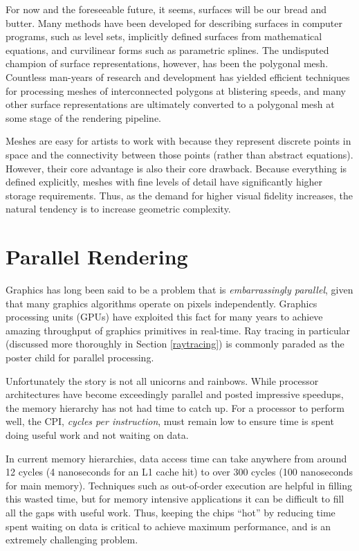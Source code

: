 \documentclass[12pt]{ucthesis}
\begin{document}
For now and the foreseeable future, it seems, surfaces will be our bread and
butter. Many methods have been developed for describing surfaces in computer
programs, such as level sets, implicitly defined surfaces from mathematical
equations, and curvilinear forms such as parametric splines. The undisputed
champion of surface representations, however, has been the polygonal mesh.
Countless man-years of research and development has yielded efficient
techniques for processing meshes of interconnected polygons at blistering
speeds, and many other surface representations are ultimately converted to a
polygonal mesh at some stage of the rendering pipeline.

Meshes are easy for artists to work with because they represent discrete
points in space and the connectivity between those points (rather than abstract
equations). However, their core advantage is also their core drawback. Because
everything is defined explicitly, meshes with fine levels of detail have
significantly higher storage requirements. Thus, as the demand for higher
visual fidelity increases, the natural tendency is to increase geometric
complexity.

\section{Parallel Rendering}
\label{parallel}

Graphics has long been said to be a problem that is \emph{embarrassingly parallel},
given that many graphics algorithms operate on pixels independently. Graphics
processing units (GPUs) have exploited this fact for many years to achieve
amazing throughput of graphics primitives in real-time. Ray tracing in
particular (discussed more thoroughly in Section \ref{raytracing}) is commonly
paraded as the poster child for parallel processing.

Unfortunately the story is not all unicorns and rainbows. While processor
architectures have become exceedingly parallel and posted impressive
speedups, the memory hierarchy has not had time to catch up. For a processor
to perform well, the CPI, \emph{cycles per instruction}, must remain low to
ensure time is spent doing useful work and not waiting on data.

In current memory hierarchies, data access time can take anywhere from around
12 cycles (4 nanoseconds for an L1 cache hit) to over 300 cycles (100
nanoseconds for main memory). Techniques such as out-of-order execution are
helpful in filling this wasted time, but for memory intensive applications it
can be difficult to fill all the gaps with useful work. Thus, keeping the chips
``hot'' by reducing time spent waiting on data is critical to achieve maximum
performance, and is an extremely challenging problem.
\end{document}
